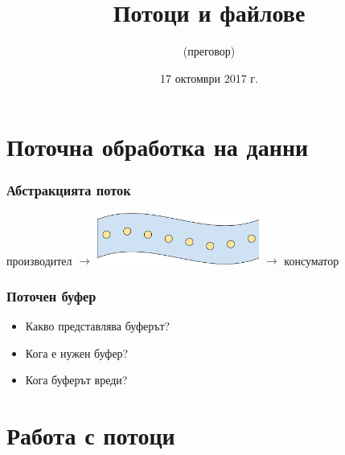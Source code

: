 \documentclass{beamer}
\title{Потоци и файлове}
\subtitle{(преговор)}
\date{17 октомври 2017 г.}
\begin{document}
\begin{frame}
  \titlepage
\end{frame}

\section{Поточна обработка на данни}

\begin{frame}
  \frametitle{Абстракцията поток}

  \begin{center}
    производител
    $\longrightarrow$ \includegraphics[width=0.4\textwidth,valign=c]{images/abstract_stream.pdf}
    $\longrightarrow$ консуматор
  \end{center}
\end{frame}


\begin{frame}
  \frametitle{Поточен буфер}

  \begin{itemize}[<+->]
  \item Какво представлява буферът?
  \item Кога е нужен буфер?
  \item Кога буферът вреди?
  \end{itemize}
  \vspace{2em}
  \onslide<+->
\end{frame}

\section{Работа с потоци}
\end{document}
